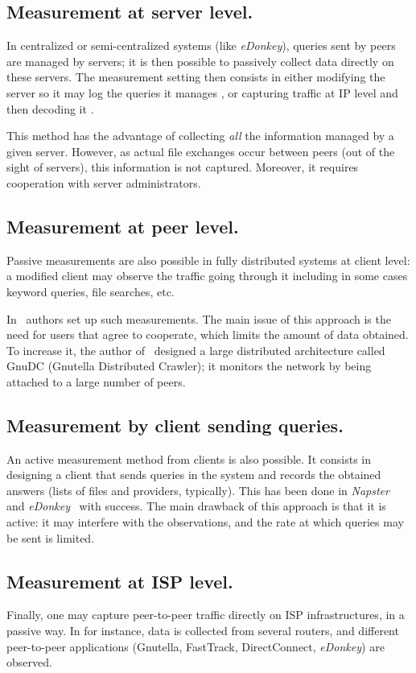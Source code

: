 \documentclass[final,
notitlepage,
narroweqnarray,
	inline,
	twoside,
]{ieee}
\begin{document}
\subsection{Measurement at server level.}
In centralized or semi-centralized systems (like {\em eDonkey}), queries
sent by peers are managed by servers; it is then possible to
passively collect data directly on these servers.
The measurement setting then consists
in either modifying the server so it may log the queries it manages
\cite{Glatapy,Clust}, or capturing traffic at IP level and then
decoding it \cite{hotp2p}.

This method has the advantage of collecting {\em all} the information
managed by a given server.
However, as actual file exchanges occur between peers (out of the sight of
servers), this information is not captured.
Moreover, it requires cooperation with server administrators.

\subsection{Measurement at peer level.}
Passive measurements are also possible in fully distributed systems at client level: 
a modified client may observe the traffic going through it including in some cases 
keyword queries, file searches, etc.

In~\cite{kasa,pam,Gnutone,isdev} authors set up such measurements. The
main issue of this approach is the need for users that agree to
cooperate, which limits the amount of data obtained. To
increase it, the author of~\cite{GnuDC}
designed a large distributed architecture called GnuDC (Gnutella
Distributed Crawler); it monitors the network by being attached to a
large number of peers.

\subsection{Measurement by client sending queries.}
An active measurement method from clients is also possible. It consists in designing a client that sends
queries in the system and records the obtained answers (lists of
files and providers, typically). This has been done in {\em Napster}~\cite{usrq}
and {\em eDonkey}~\cite{shre,clust2} with success.
The main drawback of this approach is that it is active: it may
interfere with the observations, and the rate at which queries may be
sent is limited.

\subsection{Measurement at ISP level.}
Finally, one may capture peer-to-peer traffic directly on ISP
infrastructures, in a passive way. 
  In
\cite{isp,tel,tom} for instance, data is collected from several routers,
and different peer-to-peer applications (Gnutella, FastTrack, DirectConnect,
{\em eDonkey}) are observed.
\end{document}
